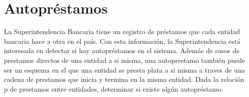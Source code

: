 \section{Autopréstamos}
La Superintendencia Bancaria tiene un registro de préstamos que cada entidad bancaria hace a otra en el país. Con esta información, la Superintendencia está interesada en detectar si hay autopréstamos en el sistema. Además de casos de prestamos directos de una entidad a si misma, una autoprestamo también puede ser un esquema en el que una entidad se presta plata a si misma a traves de una cadena de prestamos que inicia y termina en la misma entidad. Dada la relación p de prestamos entre entidades, determinar si existe algún autopréstamo.
